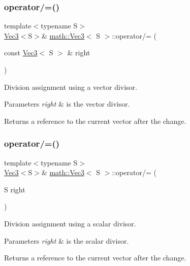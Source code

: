 \subsubsection{\texorpdfstring{operator/=()}{operator/=()}\hspace{0.1cm}{\footnotesize\ttfamily [1/2]}}
{\footnotesize\ttfamily template$<$typename S$>$ \\
\hyperlink{classmath_1_1_vec3}{Vec3}$<$S$>$\& \hyperlink{classmath_1_1_vec3}{math\+::\+Vec3}$<$ S $>$\+::operator/= (\begin{DoxyParamCaption}\item[{const \hyperlink{classmath_1_1_vec3}{Vec3}$<$ S $>$ \&}]{right }\end{DoxyParamCaption})\hspace{0.3cm}{\ttfamily [inline]}}

Division assignment using a vector divisor.


\begin{DoxyParams}{Parameters}
{\em right} & is the vector divisor.\\
\hline
\end{DoxyParams}
\begin{DoxyReturn}{Returns}
a reference to the current vector after the change. 
\end{DoxyReturn}
\mbox{\label{classmath_1_1_vec3_af25a74b600edcac72bc64c6316ea3252}} 
\subsubsection{\texorpdfstring{operator/=()}{operator/=()}\hspace{0.1cm}{\footnotesize\ttfamily [2/2]}}
{\footnotesize\ttfamily template$<$typename S$>$ \\
\hyperlink{classmath_1_1_vec3}{Vec3}$<$S$>$\& \hyperlink{classmath_1_1_vec3}{math\+::\+Vec3}$<$ S $>$\+::operator/= (\begin{DoxyParamCaption}\item[{S}]{right }\end{DoxyParamCaption})\hspace{0.3cm}{\ttfamily [inline]}}

Division assignment using a scalar divisor.


\begin{DoxyParams}{Parameters}
{\em right} & is the scalar divisor.\\
\hline
\end{DoxyParams}
\begin{DoxyReturn}{Returns}
a reference to the current vector after the change. 
\end{DoxyReturn}
\mbox{\label{classmath_1_1_vec3_abcc60135e1b3f3c66e89d502f5895f41}} 
